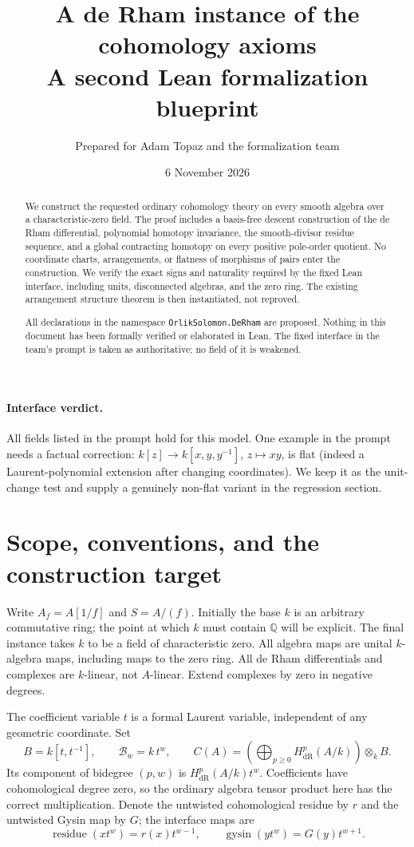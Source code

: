 \documentclass[11pt]{article}
\title{A de Rham instance of the cohomology axioms\\\large A second Lean formalization blueprint}
\author{Prepared for Adam Topaz and the formalization team}
\date{6 November 2026}
\theoremstyle{definition}
\theoremstyle{remark}
\newcommand{\dR}{\mathrm{dR}}
\begin{document}
\maketitle
\begin{abstract}
We construct the requested ordinary cohomology theory on every smooth algebra over a characteristic-zero field. The proof includes a basis-free descent construction of the de Rham differential, polynomial homotopy invariance, the smooth-divisor residue sequence, and a global contracting homotopy on every positive pole-order quotient. No coordinate charts, arrangements, or flatness of morphisms of pairs enter the construction. We verify the exact signs and naturality required by the fixed Lean interface, including units, disconnected algebras, and the zero ring. The existing arrangement structure theorem is then instantiated, not reproved.

All declarations in the namespace \texttt{OrlikSolomon.DeRham} are proposed. Nothing in this document has been formally verified or elaborated in Lean. The fixed interface in the team's prompt is taken as authoritative; no field of it is weakened.
\end{abstract}
\paragraph{Interface verdict.}
All fields listed in the prompt hold for this model. One example in the prompt needs a factual correction: \(k[z]\to k[x,y,y^{-1}]\), \(z\mapsto xy\), is flat (indeed a Laurent-polynomial extension after changing coordinates). We keep it as the unit-change test and supply a genuinely non-flat variant in the regression section.
\clearpage
\tableofcontents
\newpage
\section{Scope, conventions, and the construction target}

Write $A_f=A[1/f]$ and $S=A/(f)$. Initially the base $k$ is an arbitrary commutative ring; the point at which $k$ must contain $\mathbb Q$ will be explicit. The final instance takes $k$ to be a field of characteristic zero. All algebra maps are unital $k$-algebra maps, including maps to the zero ring. All de Rham differentials and complexes are $k$-linear, not $A$-linear. Extend complexes by zero in negative degrees.

The coefficient variable $t$ is a formal Laurent variable, independent of any geometric coordinate. Set
\[
 B=k[t,t^{-1}],\qquad \mathcal B_w=k\,t^w,\qquad
 C(A)=\left(\bigoplus_{p\geq0}H^p_{\dR}(A/k)\right)\otimes_k B.
\]
Its component of bidegree $(p,w)$ is $H^p_{\dR}(A/k)t^w$. Coefficients have cohomological degree zero, so the ordinary algebra tensor product here has the correct multiplication. Denote the untwisted cohomological residue by $r$ and the untwisted Gysin map by $G$; the interface maps are
\[
 \operatorname{residue}(x t^w)=r(x)t^{w-1},\qquad
 \operatorname{gysin}(y t^w)=G(y)t^{w+1}.
\]
\end{document}
